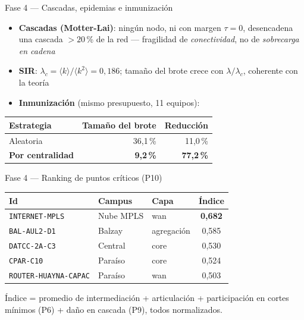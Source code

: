 \documentclass[11pt,aspectratio=169]{beamer}
\begin{document}
\begin{frame}{Fase 4 --- Cascadas, epidemias e inmunización}
\begin{itemize}
  \item \textbf{Cascadas (Motter-Lai)}: ningún nodo, ni con margen $\tau=0$,
    desencadena una cascada $>20$\,\% de la red --- fragilidad de
    \emph{conectividad}, no de \emph{sobrecarga en cadena}
  \item \textbf{SIR}: $\lambda_c=\langle k\rangle/\langle k^2\rangle=0{,}186$;
    tamaño del brote crece con $\lambda/\lambda_c$, coherente con la teoría
  \item \textbf{Inmunización} (mismo presupuesto, 11 equipos):
\end{itemize}
\begin{table}
\centering\small
\begin{tabular}{lrr}
\toprule
Estrategia & Tamaño del brote & Reducción \\
\midrule
Aleatoria & 36{,}1\,\% & 11{,}0\,\% \\
\textbf{Por centralidad} & \textbf{9{,}2\,\%} & \textbf{77{,}2\,\%} \\
\bottomrule
\end{tabular}
\end{table}
\end{frame}

\begin{frame}{Fase 4 --- Ranking de puntos críticos (P10)}
\small
\begin{table}
\begin{tabular}{lllc}
\toprule
Id & Campus & Capa & Índice \\
\midrule
\texttt{INTERNET-MPLS} & Nube MPLS & wan & \textbf{0{,}682} \\
\texttt{BAL-AUL2-D1} & Balzay & agregación & 0{,}585 \\
\texttt{DATCC-2A-C3} & Central & core & 0{,}530 \\
\texttt{CPAR-C10} & Paraíso & core & 0{,}524 \\
\texttt{ROUTER-HUAYNA-CAPAC} & Paraíso & wan & 0{,}503 \\
\bottomrule
\end{tabular}
\end{table}
\vspace{2mm}
Índice = promedio de intermediación + articulación + participación en
cortes mínimos (P6) + daño en cascada (P9), todos normalizados.
\end{frame}
\end{document}
